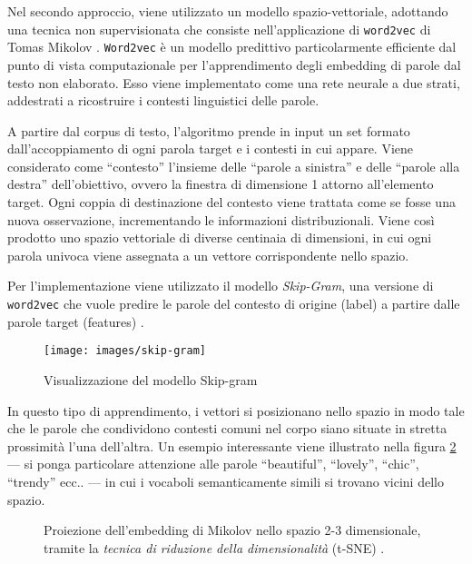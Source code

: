 Nel secondo approccio, viene utilizzato un modello spazio-vettoriale, adottando una tecnica non supervisionata che consiste nell'applicazione di \texttt{word2vec} di Tomas Mikolov \cite{mikolov2013efficient}. 
\texttt{Word2vec} è un modello predittivo particolarmente efficiente dal punto di vista computazionale per l'apprendimento degli embedding di parole dal testo non elaborato.
{\color{blue}Esso viene implementato come una} rete neurale a due strati, addestrati a ricostruire i contesti linguistici delle parole.

A partire dal corpus di testo, l'algoritmo prende in input un set formato dall'accoppiamento di ogni parola target e i contesti in cui appare. Viene considerato come ``contesto'' l'insieme delle ``parole a sinistra'' e delle ``parole alla destra'' dell'obiettivo, ovvero la finestra di dimensione 1 attorno all'elemento target. Ogni coppia di destinazione del contesto viene trattata come se fosse una nuova osservazione, incrementando le informazioni distribuzionali. Viene così prodotto uno spazio vettoriale di diverse centinaia di dimensioni, in cui ogni parola univoca viene assegnata a un vettore corrispondente nello spazio.


Per l'implementazione viene utilizzato il modello \emph{Skip-Gram}, una versione di \texttt{word2vec} che vuole predire le parole del contesto di origine (label) a partire dalle parole target (features) \cite{FIXME}.

\begin{figure}[H]
	\centering
	{\texttt{[image: images/skip-gram]}} 
	\caption{Visualizzazione del modello Skip-gram}
	\label{fig:mikolov}
\end{figure}

In questo tipo di apprendimento, i vettori si posizionano nello spazio in modo tale che le parole che condividono contesti comuni nel corpo siano situate in stretta prossimità l'una dell'altra. Un esempio interessante viene illustrato nella figura \ref{fig:embedding1} --- si ponga particolare attenzione alle parole ``beautiful'', ``lovely'', ``chic'', ``trendy'' ecc.. --- in cui i vocaboli semanticamente simili si trovano vicini dello spazio.

\begin{figure}[H]
	\centering
	\hspace{10mm}
	
	\caption{Proiezione dell'embedding di Mikolov nello spazio 2-3 dimensionale, tramite la \emph{tecnica di riduzione della dimensionalità} (t-SNE) \cite{FIXME}.}
	\label{fig:embedding1}
\end{figure}

